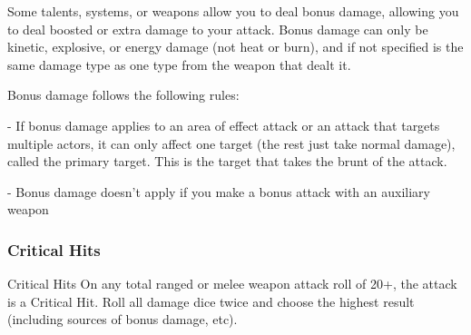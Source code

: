 Some talents, systems, or weapons allow you to deal bonus damage, allowing you to deal
boosted or extra damage to your attack. Bonus damage can only be kinetic, explosive, or energy
damage (not heat or burn), and if not specified is the same damage type as one type from the
weapon that dealt it.


Bonus damage follows the following rules:

         	- If bonus damage applies to an area of effect attack or an attack that targets multiple
         actors, it can only affect one target (the rest just take normal damage), called the primary
         target. This is the target that takes the brunt of the attack.

         	- Bonus damage doesn’t apply if you make a bonus attack with an auxiliary weapon

\subsubsection{Critical Hits}
                                                Critical Hits
On any total ranged or melee weapon attack roll of 20+, the attack is a Critical Hit. Roll all
damage dice twice and choose the highest result (including sources of bonus damage, etc).

